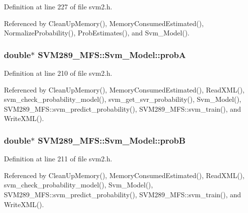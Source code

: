 Definition at line 227 of file svm2.\+h.



Referenced by Clean\+Up\+Memory(), Memory\+Consumed\+Estimated(), Normalize\+Probability(), Prob\+Estimates(), and Svm\+\_\+\+Model().

\subsubsection[{\texorpdfstring{probA}{probA}}]{\setlength{\rightskip}{0pt plus 5cm}double$\ast$ S\+V\+M289\+\_\+\+M\+F\+S\+::\+Svm\+\_\+\+Model\+::probA}\hypertarget{struct_s_v_m289___m_f_s_1_1_svm___model_ae32212566d46d6d9cafbddd37dcfbada}{}\label{struct_s_v_m289___m_f_s_1_1_svm___model_ae32212566d46d6d9cafbddd37dcfbada}


Definition at line 210 of file svm2.\+h.



Referenced by Clean\+Up\+Memory(), Memory\+Consumed\+Estimated(), Read\+X\+M\+L(), svm\+\_\+check\+\_\+probability\+\_\+model(), svm\+\_\+get\+\_\+svr\+\_\+probability(), Svm\+\_\+\+Model(), S\+V\+M289\+\_\+\+M\+F\+S\+::svm\+\_\+predict\+\_\+probability(), S\+V\+M289\+\_\+\+M\+F\+S\+::svm\+\_\+train(), and Write\+X\+M\+L().

\subsubsection[{\texorpdfstring{probB}{probB}}]{\setlength{\rightskip}{0pt plus 5cm}double$\ast$ S\+V\+M289\+\_\+\+M\+F\+S\+::\+Svm\+\_\+\+Model\+::probB}\hypertarget{struct_s_v_m289___m_f_s_1_1_svm___model_a4849dabb9dde1adde990980c6c7e1737}{}\label{struct_s_v_m289___m_f_s_1_1_svm___model_a4849dabb9dde1adde990980c6c7e1737}


Definition at line 211 of file svm2.\+h.



Referenced by Clean\+Up\+Memory(), Memory\+Consumed\+Estimated(), Read\+X\+M\+L(), svm\+\_\+check\+\_\+probability\+\_\+model(), Svm\+\_\+\+Model(), S\+V\+M289\+\_\+\+M\+F\+S\+::svm\+\_\+predict\+\_\+probability(), S\+V\+M289\+\_\+\+M\+F\+S\+::svm\+\_\+train(), and Write\+X\+M\+L().

